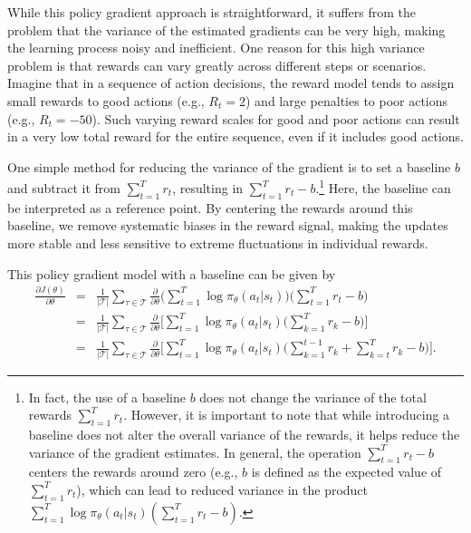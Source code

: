 While this policy gradient approach is straightforward, it suffers from the problem that the variance of the estimated gradients can be very high, making the learning process noisy and inefficient. One reason for this high variance problem is that rewards can vary greatly across different steps or scenarios. Imagine that in a sequence of action decisions, the reward model tends to assign small rewards to good actions (e.g., $R_t = 2$) and large penalties to poor actions (e.g., $R_t = -50$). Such varying reward scales for good and poor actions can result in a very low total reward for the entire sequence, even if it includes good actions.

One simple method for reducing the variance of the gradient is to set a baseline $b$ and subtract it from $\sum_{t=1}^{T} r_t$, resulting in $\sum_{t=1}^{T} r_t - b$.\footnote{In fact, the use of a baseline $b$ does not change the variance of the total rewards $\sum_{t=1}^{T} r_t$. However, it is important to note that while introducing a baseline does not alter the overall variance of the rewards, it helps reduce the variance of the gradient estimates. In general, the operation $\sum_{t=1}^{T} r_t - b$ centers the rewards around zero (e.g., $b$ is defined as the expected value of $\sum_{t=1}^{T} r_t$), which can lead to reduced variance in the product $\sum_{t=1}^{T} \log \pi_{\theta}(a_t|s_t) (\sum_{t=1}^{T} r_t - b)$.} Here, the baseline can be interpreted as a reference point. By centering the rewards around this baseline, we remove systematic biases in the reward signal, making the updates more stable and less sensitive to extreme fluctuations in individual rewards.

This policy gradient model with a baseline can be given by
\begin{eqnarray}
\frac{\partial J(\theta)}{\partial \theta} & = & \frac{1}{|\mathcal{T}|} \sum_{\tau \in \mathcal{T}} \frac{\partial}{\partial \theta} \Big( \sum_{t=1}^{T} \log \pi_{\theta}(a_t|s_t) \Big) \Big(\sum_{t=1}^{T} r_t - b \Big) \nonumber \\
& = & \frac{1}{|\mathcal{T}|} \sum_{\tau \in \mathcal{T}} \frac{\partial}{\partial \theta} \Big[ \sum_{t=1}^{T} \log \pi_{\theta}(a_t|s_t) \Big(\sum_{k=1}^{T} r_k - b \Big) \Big] \nonumber \\
& = & \frac{1}{|\mathcal{T}|} \sum_{\tau \in \mathcal{T}} \frac{\partial}{\partial \theta} \Big[ \sum_{t=1}^{T} \log \pi_{\theta}(a_t|s_t) \Big(\sum_{k=1}^{t-1} r_k + \sum_{k=t}^{T} r_k - b \Big) \Big]. \label{eq:policy-gradient-with-baseline}
\end{eqnarray}

